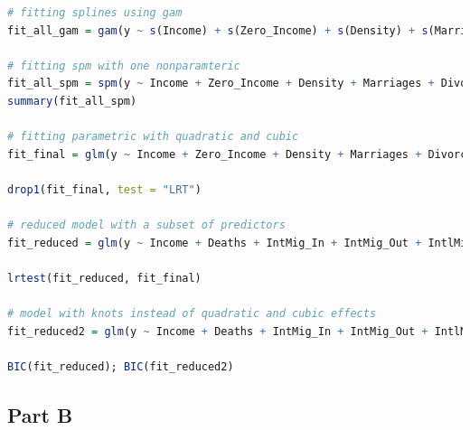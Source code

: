 \documentclass[paper=a4, fontsize=11pt]{scrartcl} %
\numberwithin{equation}{section} %
\begin{document}
\begin{lstlisting}[language = R, frame = single]
# fitting splines using gam
fit_all_gam = gam(y ~ s(Income) + s(Zero_Income) + s(Density) + s(Marriages) + s(Divorces) + s(Deaths) + s(IntMig_In) + s(IntMig_Out) + s(IntlMig_In) + s(IntlMig_Out) + s(Nationality_In) + s(Population_Dec) + s(province), family = Gamma("log")); summary(fit_all_gam); plot(fit_all_gam)

# fitting spm with one nonparamteric
fit_all_spm = spm(y ~ Income + Zero_Income + Density + Marriages + Divorces + Deaths + IntMig_In + IntMig_Out + f(IntlMig_In) + IntlMig_Out + Nationality_In + Population_Dec, family = "poisson", random = ~1, group = province)
summary(fit_all_spm)

# fitting parametric with quadratic and cubic
fit_final = glm(y ~ Income + Zero_Income + Density + Marriages + Divorces + Deaths + IntMig_In + IntMig_Out + IntlMig_In + I(IntlMig_In ^ 2) + I(IntlMig_In ^ 3) + IntlMig_Out + Nationality_In + Population_Dec + as.factor(province), family = Gamma("log")); summary(fit_final)

drop1(fit_final, test = "LRT")

# reduced model with a subset of predictors
fit_reduced = glm(y ~ Income + Deaths + IntMig_In + IntMig_Out + IntlMig_In + I(IntlMig_In ^ 2) + I(IntlMig_In ^ 3) + IntlMig_Out + Population_Dec, family = Gamma("log")); summary(fit_reduced)

lrtest(fit_reduced, fit_final)

# model with knots instead of quadratic and cubic effects
fit_reduced2 = glm(y ~ Income + Deaths + IntMig_In + IntMig_Out + IntlMig_In + pmax((IntlMig_In - 400),0) + pmax((IntlMig_In - 1300),0) + IntlMig_Out + Population_Dec, family = Gamma("log")); summary(fit_reduced2)

BIC(fit_reduced); BIC(fit_reduced2)
\end{lstlisting}

\subsection{Part B}
\end{document}
